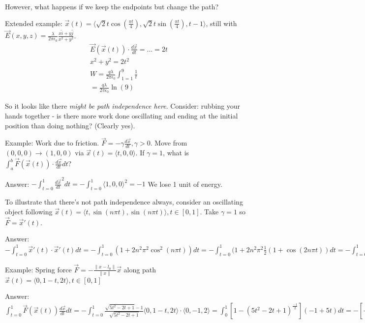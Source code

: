 \documentclass[11pt, oneside]{article}   	%
\begin{document}
However, what happens if we keep the endpoints but change the path?

Extended example: $\vec{x}(t) = \langle \sqrt{2}t \cos(\frac{\pi t}{4}), \sqrt{2}t \sin(\frac{\pi t}{4}), t-1\rangle$, still with $\vec{E}(x,y,z)= \frac{\lambda}{2 \pi \epsilon_0} \frac{x \hat{i} + y \hat{j}}{x^2+y^2}$.  
\begin{align}
\vec{E}(\vec{x}(t))  \cdot \frac{d\vec{x}}{dt} = ... = 2t \\
x^2 + y^2 = 2t^2 \\
W =  \frac{q \lambda}{2 \pi \epsilon_0} \int_{1=1}^9 \frac{1}{t}  \\
= \frac{q \lambda}{2 \pi \epsilon_0} \ln(9)
\end{align}

So it looks like there \emph{might be path independence here}.  Consider: rubbing your hands together - is there more work done oscillating and ending at the initial position than doing nothing? (Clearly yes).

Example: Work due to friction. $\vec{F} = -\gamma \frac{d\vec{x}}{dt}, \gamma > 0$.  Move from $(0,0,0) \rightarrow (1,0,0)$ via $\vec{x}(t) = \langle t, 0, 0 \rangle$.  If $\gamma = 1$, what is $\int_a^b \vec{F}(\vec{x}(t)) \cdot \frac{d \vec{x}}{dt} dt$?

Answer: $-\int_{t=0}^1 \frac{d \vec{x}}{dt}^2dt = - \int_{t=0}^1 \langle 1, 0, 0 \rangle ^2 = -1$  We lose 1 unit of energy.

To illustrate that there's not path independence always, consider an oscillating object following $\vec{x}(t) = \langle t, \sin(n\pi t), \sin(n \pi t) \rangle, t \in [0,1]$.  Take $\gamma = 1$ so $\vec{F} = \vec{x}'(t).$

Answer: $- \int_{t=0}^1 \vec{x}'(t) \cdot \vec{x}'(t) dt = - \int_{t=0}^1 (1+2n^2\pi^2\cos^2(n \pi t)) dt =  -\int_{t=0}^1(1+ 2n^2\pi^2 \frac{1}{2}(1 + \cos(2 n \pi t))  dt = -\int_{t=0}^1 (1 + n^2\pi^2+2n^2\pi^2\cos(2n\pi t))dt = -[ t + tn^2\pi^2 =+n\pi \sin(2 n \pi t)]_0^1 = -[1 + n^2\pi^2]$

Example: Spring force $\vec{F} = -\frac{\|x - l_0\|}{\|x\|} \vec{x}$ along path $\vec{x}(t) = \langle 0, 1-t, 2t\rangle, t \in [0,1]$

Answer: $\int_{t=0}^1 \vec{F}(\vec{x}(t)) \frac{d \vec{x}}{dt}dt = - \int_{t=0}^1 \frac{\sqrt{5t^2 - 2t + 1} - 1}{\sqrt{5t^2 - 2t + 1}} \langle 0, 1-t, 2t \rangle \cdot \langle 0, -1, 2 \rangle= \int_0^1 [1 - (5t^2 - 2t + 1)^\frac{-1}{2}](-1 + 5t)dt = -[-t + \frac{5}{2}t^2 - (5t^2 - 2t +1)^\frac{1}{2}]_0^1 = -\frac{1}{2}$
\end{document}
